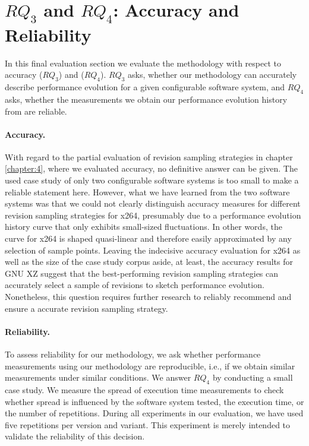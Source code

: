\section{$RQ_3$ and $RQ_4$: Accuracy and Reliability}
\label{sec:reliability} In this final evaluation section we evaluate the
methodology with respect to accuracy ($RQ_3$) and ($RQ_4$). $RQ_3$ asks, whether
our methodology can accurately describe performance evolution for a given
configurable software system, and $RQ_4$ asks, whether the measurements we
obtain our performance evolution history from are reliable.

\paragraph{Accuracy.} With regard to the partial
evaluation of revision sampling strategies in chapter\,\ref{chapter:4}, where we
evaluated accuracy, no definitive answer can be given.
The used case study of only two configurable software systems is too small to make a reliable statement
here. However, what we have learned from the two software systems was that we
could not clearly distinguish accuracy measures for different revision sampling
strategies for x264, presumably due to a performance evolution history curve
that only exhibits small-sized fluctuations. In other words, the curve for x264
is shaped quasi-linear and therefore easily approximated by any selection of
sample points. Leaving the indecisive accuracy evaluation for x264 as well as
the size of the case study corpus aside, at least, the accuracy results for GNU
XZ suggest that the best-performing revision sampling strategies can accurately
select a sample of revisions to sketch performance evolution. Nonetheless, this
question requires further research to reliably recommend and ensure a accurate
revision sampling strategy.

\paragraph{Reliability.} To assess reliability for our methodology, we ask
whether performance measurements using our methodology are reproducible, i.e.,
if we obtain similar measurements under similar conditions. We answer
$RQ_4$ by conducting a small case study. We measure the spread of
execution time measurements to check whether spread is influenced by the
software system tested, the execution time, or the number of repetitions.
During all experiments in our evaluation, we have used five repetitions per
version and variant. This experiment is merely intended to validate the
reliability of this decision. 

